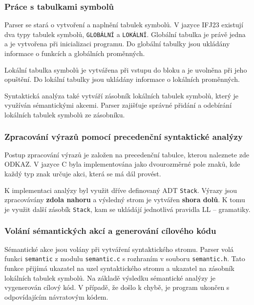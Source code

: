 \documentclass[a4paper, 11pt]{article}
\begin{document}
	\subsubsection{Práce s tabulkami symbolů}
	Parser se stará o vytvoření a naplnění tabulek symbolů. V jazyce IFJ23 existují dva typy tabulek symbolů, \texttt{GLOBÁLNÍ} a \texttt{LOKÁLNÍ}.
	Globální tabulka je právě jedna a je vytvořena při inicializaci programu. Do globální tabulky jsou ukládány informace o funkcích a globálních proměnných.
	\par\noindent Lokální tabulka symbolů je vytvářena při vstupu do bloku a je uvolněna při jeho opuštění. Do lokální tabulky jsou ukládány informace o lokálních proměnných.
	\par\noindent Syntaktická analýza také vytváří zásobník lokálních tabulek symbolů, který je využíván sémantickými akcemi. Parser zajišťuje správné přidání a odebírání lokálních tabulek symbolů ze zásobníku. 

	\subsubsection{Zpracování výrazů pomocí precedenční syntaktické analýzy}
	\label{sec:precedence}
	Postup zpracování výrazů je založen na precedenční tabulce, kterou naleznete zde ODKAZ. V jazyce C byla implementována jako dvourozměrné pole znaků, kde každý typ znak určuje akci, která se má dál provést. 
	\par\noindent K implementaci analýzy byl využit dříve definovaný ADT \texttt{Stack}. Výrazy jsou zpracovávány \textbf{zdola nahoru} a výsledný strom je vytvářen \textbf{shora dolů}. K tomu je využit další zásobík \texttt{Stack}, kam se ukládájí jednotlivá pravidla LL -- gramatiky.


	\subsubsection{Volání sémantických akcí a generování cílového kódu}
	\label{sec:sem}
	Sémantické akce jsou volány při vytváření syntaktického stromu. Parser volá funkci \texttt{semantic} z modulu \texttt{semantic.c} s rozhraním v souboru \texttt{semantic.h}. Tato funkce přijímá ukazatel na uzel syntaktického stromu a ukazatel na zásobník lokálních tabulek symbolů.
	Na základě výsledku sémantické analýzy je vygenerován cílový kód. V případě, že došlo k chybě, je program ukončen s odpovídajícím návratovým kódem.
\end{document}
